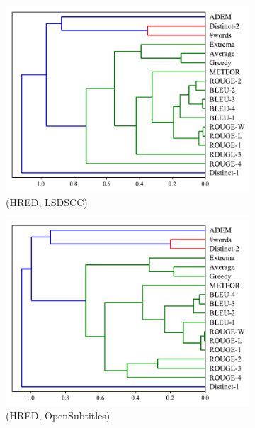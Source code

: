 \begin{figure}[htb]
    \begin{subfigure}{0.35\linewidth}
        \centering
        \includegraphics[width=\linewidth]{figure/plot/hierarchy/v3/pearson/hred/lsdscc/plot.pdf}
        \caption{(HRED, LSDSCC)}
    \end{subfigure}%
    \begin{subfigure}{0.35\linewidth}
        \centering
        \includegraphics[width=\linewidth]{figure/plot/hierarchy/v3/pearson/hred/opensub/plot.pdf}
        \caption{(HRED, OpenSubtitles)}
    \end{subfigure}%
    \begin{subfigure}{0.35\linewidth}

\end{subfigure}
\end{figure}
